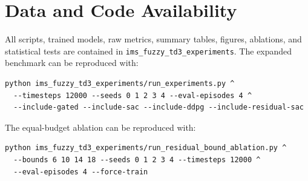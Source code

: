 \documentclass[reprint,amsmath,amssymb,aps,pra]{revtex4-2}
\begin{document}
\section*{Data and Code Availability}

All scripts, trained models, raw metrics, summary tables, figures, ablations, and statistical tests are contained in \texttt{ims\_fuzzy\_td3\_experiments}. The expanded benchmark can be reproduced with:
\begin{widetext}
\begin{verbatim}
python ims_fuzzy_td3_experiments/run_experiments.py ^
  --timesteps 12000 --seeds 0 1 2 3 4 --eval-episodes 4 ^
  --include-gated --include-sac --include-ddpg --include-residual-sac
\end{verbatim}
The equal-budget ablation can be reproduced with:
\begin{verbatim}
python ims_fuzzy_td3_experiments/run_residual_bound_ablation.py ^
  --bounds 6 10 14 18 --seeds 0 1 2 3 4 --timesteps 12000 ^
  --eval-episodes 4 --force-train
\end{verbatim}
\end{widetext}



\end{document}
